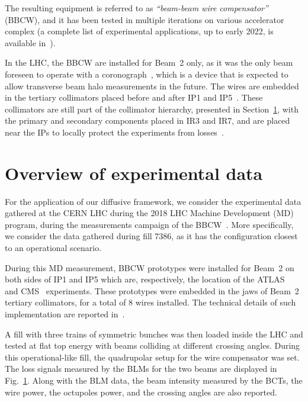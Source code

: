 The resulting equipment is referred to as \textit{``beam-beam wire compensator''} (BBCW), and it has been tested in multiple iterations on various accelerator complex (a complete list of experimental applications, up to early 2022, is available in~\cite{}).

In the LHC, the BBCW are installed for Beam~2 only, as it was the only beam foreseen to operate with a coronograph~\cite{}, which is a device that is expected to allow transverse beam halo measurements in the future. The wires are embedded in the tertiary collimators placed before and after IP1 and IP5~\cite{}. These collimators are still part of the collimator hierarchy, presented in Section~\ref{}, with the primary and secondary components placed in IR3 and IR7, and are placed near the IPs to locally protect the experiments from losses~\cite{}.

\section{Overview of experimental data}

For the application of our diffusive framework, we consider the experimental data gathered at the CERN LHC during the 2018 LHC Machine Development (MD) program, during the measurements campaign of the BBCW~\cite{}. More specifically, we consider the data gathered during fill 7386, as it has the configuration closest to an operational scenario.

During this MD measurement, BBCW prototypes were installed for Beam~2 on both sides of IP1 and IP5 which are, respectively, the location of the ATLAS~\cite{} and CMS~\cite{} experiments. These prototypes were embedded in the jaws of Beam~2 tertiary collimators, for a total of 8 wires installed. The technical details of such implementation are reported in~\cite{}.

A fill with three trains of symmetric bunches was then loaded inside the LHC and tested at flat top energy with beams colliding at different crossing angles. During this operational-like fill, the quadrupolar setup for the wire compensator was set. The loss signals measured by the BLMs for the two beams are displayed in Fig.~\ref{fig:wire-data}. Along with the BLM data, the beam intensity measured by the BCTs, the wire power, the octupoles power, and the crossing angles are also reported. 

\begin{figure}
    \centering
    \caption{}
    \label{fig:wire-data}
\end{figure}

